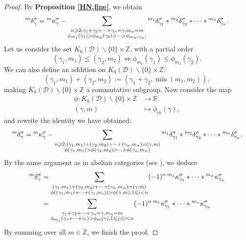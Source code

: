 \documentclass[a4paper,12pt]{amsart}
\begin{document}
\begin{proof}
    By \textbf{Proposition \ref{HN,fine}}, we obtain
    \[{^m}\delta^\sigma_\gamma={^m}\kappa^\sigma_\gamma-\sum_{\begin{subarray}{c}
         \\  n\geqslant2,{\gamma_1+\gamma_2+\dots+\gamma_n=\gamma},m_n=m\\{\phi_{m_1}(\gamma_1)>\phi_{m_2}(\gamma_2)>\dots>\phi_{m_n(\gamma_n)}}
    \end{subarray}}{^{m_1}}\delta^\sigma_{\gamma_1}*{^{m_2}}\delta^\sigma_{\gamma_2}*\dots*{^{m_n}}\delta^\sigma_{\gamma_n}.\]
    Let us consider the set $K_0(\mathcal{D})\backslash\{0\}\times\mathbb{Z}$, with a partial order
    \[(\gamma_1,m_1)\leqslant(\gamma_2,m_2)\iff\phi_{m_1}(\gamma_1)\leqslant\phi_{m_2}(\gamma_2).\]
    We can also define an addition on $K_0(\mathcal{D})\backslash\{0\}\times\mathbb{Z}$:
    \[(\gamma_1,m_1)+(\gamma_2,m_2):=(\gamma_1+\gamma_2,\min(m_1,m_2)),\]
    making $K_0(\mathcal{D})\backslash\{0\}\times\mathbb{Z}$ a commutative subgroup. Now consider the map
    \begin{align*}
        \phi:K_0(\mathcal{D})\backslash\{0\}\times\mathbb{Z}&\rightarrow\mathbb{R}\\
        (\gamma,m)&\mapsto\phi_m(\gamma),
    \end{align*}
    and rewrite the identity we have obtained:
    \[{^m}\delta^\sigma_\gamma={^m}\kappa^\sigma_\gamma-\sum_{\begin{subarray}{c}
         \\  n\geqslant2,(\gamma_1,m_1)+(\gamma_2,m_2)+\dots+(\gamma_n,m_n)=(\gamma,m)\\\phi(\gamma_1,m_1)>\phi(\gamma_2,m_2)>\dots>\phi(\gamma_n,m_n)
    \end{subarray}}{^{m_1}}\delta^\sigma_{\gamma_1}*{^{m_2}}\delta^\sigma_{\gamma_2}*\dots*{^{m_n}}\delta^\sigma_{\gamma_n}.\]
    By the same argument as in abelian categories (see \cite[Theorem 5.1]{Rei2002}), we deduce
    \begin{align*}
        {^m}\delta^\sigma_\gamma&=\sum_{\begin{subarray}{c}
         \\  (\gamma_1,m_1)+(\gamma_2,m_2)+\dots+(\gamma_n,m_n)=(\gamma,m)\\\phi((\gamma_1,m_1)+\dots+(\gamma_i,m_i))>\phi(\gamma,m),1\leqslant i<n\\
    \end{subarray}}(-1)^n\,{^{m_1}}\kappa^\sigma_{\gamma_1}*\dots*{^{m_n}}\kappa^\sigma_{\gamma_n}\\
    &=\sum_{\begin{subarray}{c}
         \\  \gamma_1+\gamma_2+\dots+\gamma_n=\gamma,m_n=m\\{\phi_{m_j}}(\gamma_1+\dots+\gamma_i)>\phi_m(\gamma),1\leqslant j\leqslant i<n\\
    \end{subarray}}(-1)^n\,{^{m_1}}\kappa^\sigma_{\gamma_1}*\dots*{^{m_n}}\kappa^\sigma_{\gamma_n}
    \end{align*}
    By summing over all $m\in\mathbb{Z}$, we finish the proof.
\end{proof}
\end{document}
